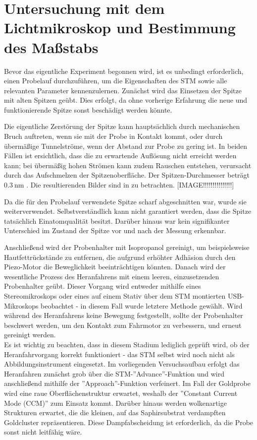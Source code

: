 \chapter{Untersuchung mit dem Lichtmikroskop und Bestimmung des Maßstabs}
Bevor das eigentliche Experiment begonnen wird, ist es unbedingt erforderlich, einen Probelauf durchzuführen, um die Eigenschaften des STM sowie alle relevanten Parameter kennenzulernen. 
Zunächst wird das Einsetzen der Spitze mit alten Spitzen geübt. Dies erfolgt, da ohne vorherige Erfahrung die neue und funktionierende Spitze sonst beschädigt werden könnte.

Die eigentliche Zerstörung der Spitze kann hauptsächlich durch mechanischen Bruch auftreten, wenn sie mit der Probe in Kontakt kommt, oder durch übermäßige Tunnelströme, wenn der Abstand zur Probe zu gering ist. 
In beiden Fällen ist ersichtlich, dass die zu erwartende Auflösung nicht erreicht werden kann; bei übermäßig hohen Strömen kann zudem Rauschen entstehen, verursacht durch das Aufschmelzen der Spitzenoberfläche. Der Spitzen-Durchmesser beträgt $\SI{0.3}{\nm}$ \cite{praktikum}. 
Die resultierenden Bilder sind in  zu betrachten. 
[IMAGE!!!!!!!!!!!!!!!]

Da die für den Probelauf verwendete Spitze scharf abgeschnitten war, wurde sie weiterverwendet. Selbstverständlich kann nicht garantiert werden, dass die Spitze tatsächlich Einatomqualität besitzt. 
Darüber hinaus war kein signifikanter Unterschied im Zustand der Spitze vor und nach der Messung erkennbar.

Anschließend wird der Probenhalter mit Isopropanol gereinigt, um beispielsweise Hautfettrückstände zu entfernen, die aufgrund erhöhter Adhäsion durch den Piezo-Motor die Beweglichkeit beeinträchtigen könnten. 
Danach wird der wesentliche Prozess des Heranfahrens mit einem leeren, einzusetzenden Probenhalter geübt. 
Dieser Vorgang wird entweder mithilfe eines Stereomikroskops oder eines auf einem Stativ über dem STM montierten USB-Mikroskops beobachtet - in diesem Fall wurde letztere Methode gewählt. 
Wird während des Heranfahrens keine Bewegung festgestellt, sollte der Probenhalter beschwert werden, um den Kontakt zum Fahrmotor zu verbessern, und erneut gereinigt werden.\\
Es ist wichtig zu beachten, dass in diesem Stadium lediglich geprüft wird, ob der Heranfahrvorgang korrekt funktioniert - das STM selbst wird noch nicht als Abbildungsinstrument eingesetzt.
Im vorliegenden Versuchsaufbau erfolgt das Heranfahren zunächst grob über die STM-''Advance''-Funktion und wird anschließend mithilfe der ''Approach''-Funktion verfeinert. 
Im Fall der Goldprobe wird eine raue Oberflächenstruktur erwartet, weshalb der ''Constant Current Mode (CCM)'' zum Einsatz kommt. Darüber hinaus werden wolkenartige Strukturen erwartet, die die kleinen, auf das Saphirsubstrat verdampften Goldcluster repräsentieren. 
Diese Dampfabscheidung ist erforderlich, da die Probe sonst nicht leitfähig wäre.

